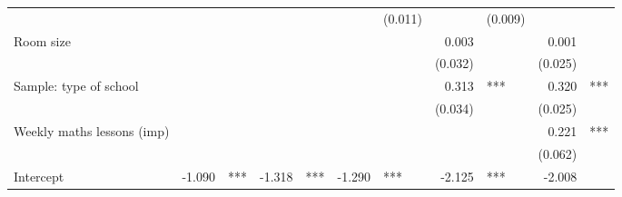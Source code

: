 \documentclass{article}
\begin{document}
\begin{table}[!h]
\begin{tabular}{lllllllllll}
  \multicolumn{1}{r}{} &
  \multicolumn{1}{l}{} &
  \multicolumn{1}{r}{} &
  \multicolumn{1}{l}{} &
  \multicolumn{1}{r}{} &
  \multicolumn{1}{l}{} &
  \multicolumn{1}{r}{(0.011)} &
  \multicolumn{1}{l}{} &
  \multicolumn{1}{r}{(0.009)} &
  \multicolumn{1}{l}{} \\
\multicolumn{1}{l}{Room size} &
  \multicolumn{1}{r}{} &
  \multicolumn{1}{l}{} &
  \multicolumn{1}{r}{} &
  \multicolumn{1}{l}{} &
  \multicolumn{1}{r}{} &
  \multicolumn{1}{l}{} &
  \multicolumn{1}{r}{0.003} &
  \multicolumn{1}{l}{} &
  \multicolumn{1}{r}{0.001} &
  \multicolumn{1}{l}{} \\
\multicolumn{1}{l}{} &
  \multicolumn{1}{r}{} &
  \multicolumn{1}{l}{} &
  \multicolumn{1}{r}{} &
  \multicolumn{1}{l}{} &
  \multicolumn{1}{r}{} &
  \multicolumn{1}{l}{} &
  \multicolumn{1}{r}{(0.032)} &
  \multicolumn{1}{l}{} &
  \multicolumn{1}{r}{(0.025)} &
  \multicolumn{1}{l}{} \\
\multicolumn{1}{l}{Sample: type of school} &
  \multicolumn{1}{r}{} &
  \multicolumn{1}{l}{} &
  \multicolumn{1}{r}{} &
  \multicolumn{1}{l}{} &
  \multicolumn{1}{r}{} &
  \multicolumn{1}{l}{} &
  \multicolumn{1}{r}{0.313} &
  \multicolumn{1}{l}{***} &
  \multicolumn{1}{r}{0.320} &
  \multicolumn{1}{l}{***} \\
\multicolumn{1}{l}{} &
  \multicolumn{1}{r}{} &
  \multicolumn{1}{l}{} &
  \multicolumn{1}{r}{} &
  \multicolumn{1}{l}{} &
  \multicolumn{1}{r}{} &
  \multicolumn{1}{l}{} &
  \multicolumn{1}{r}{(0.034)} &
  \multicolumn{1}{l}{} &
  \multicolumn{1}{r}{(0.025)} &
  \multicolumn{1}{l}{} \\
\multicolumn{1}{l}{Weekly maths lessons (imp)} &
  \multicolumn{1}{r}{} &
  \multicolumn{1}{l}{} &
  \multicolumn{1}{r}{} &
  \multicolumn{1}{l}{} &
  \multicolumn{1}{r}{} &
  \multicolumn{1}{l}{} &
  \multicolumn{1}{r}{} &
  \multicolumn{1}{l}{} &
  \multicolumn{1}{r}{0.221} &
  \multicolumn{1}{l}{***} \\
\multicolumn{1}{l}{} &
  \multicolumn{1}{r}{} &
  \multicolumn{1}{l}{} &
  \multicolumn{1}{r}{} &
  \multicolumn{1}{l}{} &
  \multicolumn{1}{r}{} &
  \multicolumn{1}{l}{} &
  \multicolumn{1}{r}{} &
  \multicolumn{1}{l}{} &
  \multicolumn{1}{r}{(0.062)} &
  \multicolumn{1}{l}{} \\
\multicolumn{1}{l}{Intercept} &
  \multicolumn{1}{r}{-1.090} &
  \multicolumn{1}{l}{***} &
  \multicolumn{1}{r}{-1.318} &
  \multicolumn{1}{l}{***} &
  \multicolumn{1}{r}{-1.290} &
  \multicolumn{1}{l}{***} &
  \multicolumn{1}{r}{-2.125} &
  \multicolumn{1}{l}{***} &
  \multicolumn{1}{r}{-2.008} &

\end{tabular}
\end{table}
\end{document}
